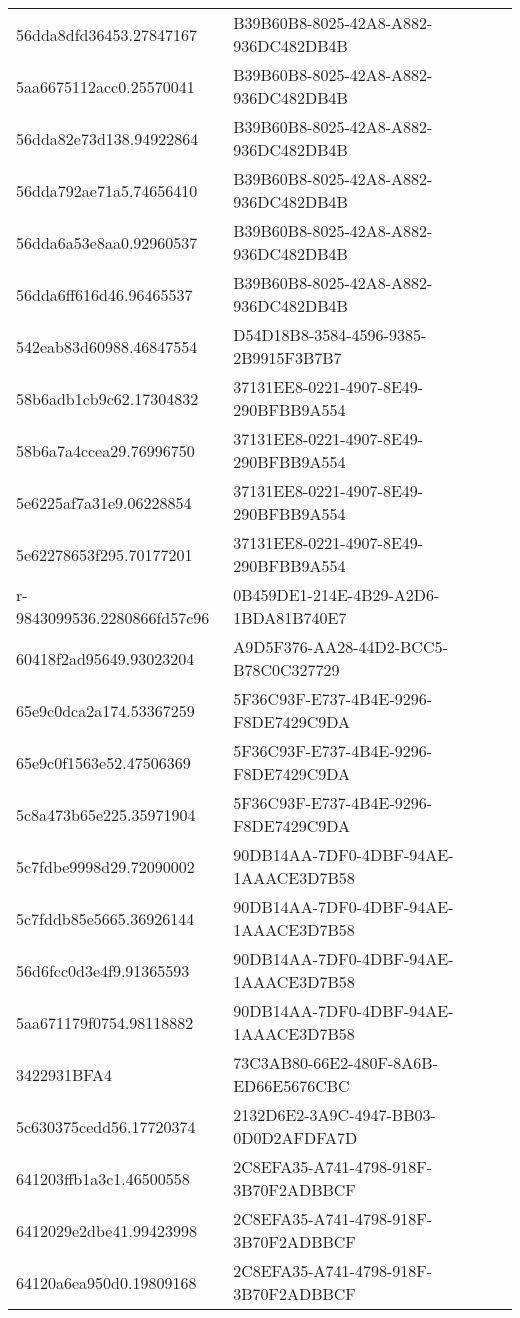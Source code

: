 \begin{tabular}{ll}
56dda8dfd36453.27847167 & B39B60B8-8025-42A8-A882-936DC482DB4B \\
5aa6675112acc0.25570041 & B39B60B8-8025-42A8-A882-936DC482DB4B \\
56dda82e73d138.94922864 & B39B60B8-8025-42A8-A882-936DC482DB4B \\
56dda792ae71a5.74656410 & B39B60B8-8025-42A8-A882-936DC482DB4B \\
56dda6a53e8aa0.92960537 & B39B60B8-8025-42A8-A882-936DC482DB4B \\
56dda6ff616d46.96465537 & B39B60B8-8025-42A8-A882-936DC482DB4B \\
542eab83d60988.46847554 & D54D18B8-3584-4596-9385-2B9915F3B7B7 \\
58b6adb1cb9c62.17304832 & 37131EE8-0221-4907-8E49-290BFBB9A554 \\
58b6a7a4ccea29.76996750 & 37131EE8-0221-4907-8E49-290BFBB9A554 \\
5e6225af7a31e9.06228854 & 37131EE8-0221-4907-8E49-290BFBB9A554 \\
5e62278653f295.70177201 & 37131EE8-0221-4907-8E49-290BFBB9A554 \\
r-9843099536.2280866fd57c96 & 0B459DE1-214E-4B29-A2D6-1BDA81B740E7 \\
60418f2ad95649.93023204 & A9D5F376-AA28-44D2-BCC5-B78C0C327729 \\
65e9c0dca2a174.53367259 & 5F36C93F-E737-4B4E-9296-F8DE7429C9DA \\
65e9c0f1563e52.47506369 & 5F36C93F-E737-4B4E-9296-F8DE7429C9DA \\
5c8a473b65e225.35971904 & 5F36C93F-E737-4B4E-9296-F8DE7429C9DA \\
5c7fdbe9998d29.72090002 & 90DB14AA-7DF0-4DBF-94AE-1AAACE3D7B58 \\
5c7fddb85e5665.36926144 & 90DB14AA-7DF0-4DBF-94AE-1AAACE3D7B58 \\
56d6fcc0d3e4f9.91365593 & 90DB14AA-7DF0-4DBF-94AE-1AAACE3D7B58 \\
5aa671179f0754.98118882 & 90DB14AA-7DF0-4DBF-94AE-1AAACE3D7B58 \\
3422931BFA4 & 73C3AB80-66E2-480F-8A6B-ED66E5676CBC \\
5c630375cedd56.17720374 & 2132D6E2-3A9C-4947-BB03-0D0D2AFDFA7D \\
641203ffb1a3c1.46500558 & 2C8EFA35-A741-4798-918F-3B70F2ADBBCF \\
6412029e2dbe41.99423998 & 2C8EFA35-A741-4798-918F-3B70F2ADBBCF \\
64120a6ea950d0.19809168 & 2C8EFA35-A741-4798-918F-3B70F2ADBBCF \\

\end{tabular}
